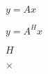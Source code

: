 \documentclass{article}
\begin{document}
$y = A x$
\pagebreak

$y = A^H x$
\pagebreak

$H$
\pagebreak

$\times$
\pagebreak
\end{document}
